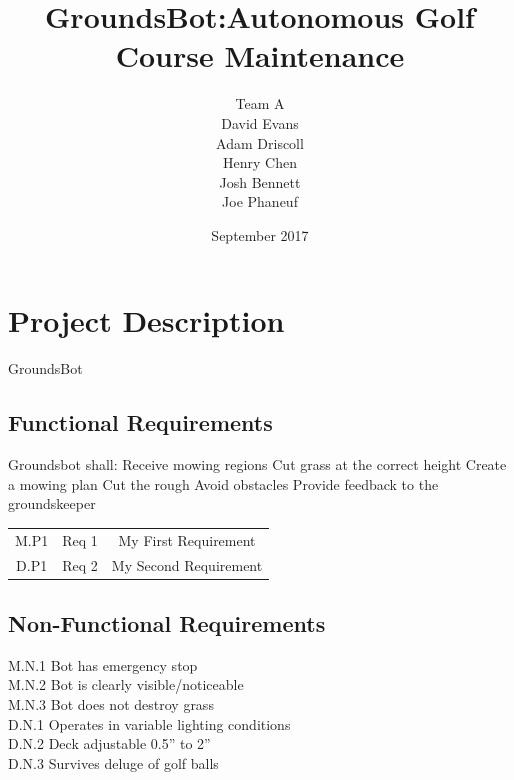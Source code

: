 \documentclass{article}
\begin{document}


\title{GroundsBot:Autonomous Golf Course Maintenance}
\date{September 2017}
\author{Team A        \\ David Evans \\
        Adam Driscoll \\ Henry Chen  \\
        Josh Bennett  \\ Joe Phaneuf \\ }
\maketitle
\newpage

\tableofcontents
\newpage

\section{Project Description}
GroundsBot \\
\subsection{Functional Requirements}
Groundsbot shall:
  Receive mowing regions
  Cut grass at the correct height
  Create a mowing plan
  Cut the rough 
  Avoid obstacles
  Provide feedback to the groundskeeper
\begin{center}
\begin{tabular}{ |c|c|c| }
  \hline
    M.P1 & Req 1 & My First Requirement \\
    D.P1 & Req 2 & My Second Requirement \\
  \hline
\end{tabular}
\end{center}

\subsection{Non-Functional Requirements}
M.N.1 Bot has emergency stop \\
M.N.2 Bot is clearly visible/noticeable \\
M.N.3 Bot does not destroy grass \\
D.N.1 Operates in variable lighting conditions \\
D.N.2 Deck adjustable 0.5” to 2” \\
D.N.3 Survives deluge of golf balls \\
\end{document}
